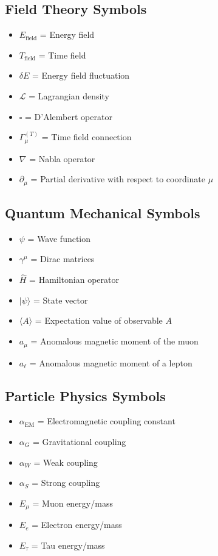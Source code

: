 \documentclass[12pt,a4paper]{article}
\begin{document}
	\subsection{Field Theory Symbols}
	\begin{itemize}
		\item $E_{\text{field}}$ = Energy field
		\item $T_{\text{field}}$ = Time field
		\item $\delta E$ = Energy field fluctuation
		\item $\mathcal{L}$ = Lagrangian density
		\item $\square$ = D'Alembert operator
		\item $\Gamma_\mu^{(T)}$ = Time field connection
		\item $\nabla$ = Nabla operator
		\item $\partial_\mu$ = Partial derivative with respect to coordinate $\mu$
	\end{itemize}
	
	\subsection{Quantum Mechanical Symbols}
	\begin{itemize}
		\item $\psi$ = Wave function
		\item $\gamma^\mu$ = Dirac matrices
		\item $\hat{H}$ = Hamiltonian operator
		\item $|\psi\rangle$ = State vector
		\item $\langle A \rangle$ = Expectation value of observable $A$
		\item $a_\mu$ = Anomalous magnetic moment of the muon
		\item $a_\ell$ = Anomalous magnetic moment of a lepton
	\end{itemize}
	
	\subsection{Particle Physics Symbols}
	\begin{itemize}
		\item $\alpha_{\text{EM}}$ = Electromagnetic coupling constant
		\item $\alpha_G$ = Gravitational coupling
		\item $\alpha_W$ = Weak coupling
		\item $\alpha_S$ = Strong coupling
		\item $E_\mu$ = Muon energy/mass
		\item $E_e$ = Electron energy/mass
		\item $E_\tau$ = Tau energy/mass
	\end{itemize}
	
\end{document}
